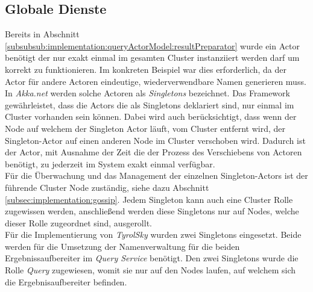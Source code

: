\subsection{Globale Dienste}
\label{subsec:implementation:singeltons}
Bereits in Abschnitt \ref{subsubsub:implementation:queryActorModel:resultPreparator} wurde ein Actor benötigt der nur exakt einmal im gesamten Cluster instanziiert werden darf um korrekt zu funktionieren. Im konkreten Beispiel war dies erforderlich, da der Actor für andere Actoren eindeutige, wiederverwendbare Namen generieren muss. In \textit{Akka.net} werden solche Actoren als \textit{Singletons} bezeichnet. Das Framework gewährleistet, dass die Actors die als Singletons deklariert sind, nur einmal im Cluster vorhanden sein können. Dabei wird auch berücksichtigt, dass wenn der Node auf welchem der Singleton Actor läuft, vom Cluster entfernt wird, der Singleton-Actor auf einen anderen Node im Cluster verschoben wird. Dadurch ist der Actor, mit Ausnahme der Zeit die der Prozess des Verschiebens von Actoren benötigt, zu jederzeit im System exakt einmal verfügbar. \\
Für die Überwachung und das Management der einzelnen Singleton-Actors ist der führende Cluster Node zuständig, siehe dazu Abschnitt \ref{subsec:implementation:gossip}. Jedem Singleton kann auch eine Cluster Rolle zugewissen werden, anschließend werden diese Singletons nur auf Nodes, welche dieser Rolle zugeordnet sind, ausgerollt. \\
Für die Implementierung von \textit{TyrolSky} wurden zwei Singletons eingesetzt. Beide werden für die Umsetzung der Namenverwaltung für die beiden Ergebnissaufbereiter im \textit{Query Service} benötigt.  Den zwei Singletons wurde die Rolle \textit{Query} zugewiesen,  womit sie nur auf den Nodes laufen, auf welchem sich die Ergebnisaufbereiter befinden.

